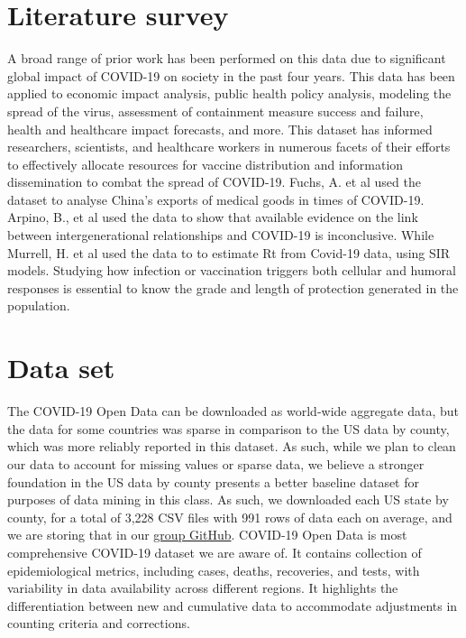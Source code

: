 \documentclass[sigconf,screen,nonacm]{acmart}
\begin{document}
\section{Literature survey}
A broad range of prior work has been performed on this data due to significant global impact of COVID-19 on society in the past four years. This data has been applied to economic impact analysis, public health policy analysis, modeling the spread of the virus, assessment of containment measure success and failure, health and healthcare impact forecasts, and more. This dataset has informed researchers, scientists, and healthcare workers in numerous facets of their efforts to effectively allocate resources for vaccine distribution and information dissemination to combat the spread of COVID-19. Fuchs, A. et al \cite{fuchs2020mask} used the dataset to analyse China’s exports of medical goods in times of COVID-19. Arpino, B., et al \cite{arpino2020no} used the data to show that available evidence on the link between intergenerational relationships and COVID-19 is inconclusive. While Murrell, H. et al \cite{murrell2020estimating} used the data to to estimate Rt from Covid-19 data, using SIR models. Studying how infection or vaccination triggers both cellular and humoral responses is essential to know the grade and length of protection generated in the population.

\section{Data set}

The COVID-19 Open Data can be downloaded as world-wide aggregate data, but the data for some countries was sparse in comparison to the US data by county, which was more reliably reported in this dataset. As such, while we plan to clean our data to account for missing values or sparse data, we believe a stronger foundation in the US data by county presents a better baseline dataset for purposes of data mining in this class. As such, we downloaded each US state by county, for a total of 3,228 CSV files with 991 rows of data each on average, and we are storing that in our \href{https://github.com/CCoakley6/DataMiningProjectSpring2024}{group GitHub}. COVID-19 Open Data is most comprehensive COVID-19 dataset we are aware of. It contains collection of epidemiological metrics, including cases, deaths, recoveries, and tests, with variability in data availability across different regions. It highlights the differentiation between new and cumulative data to accommodate adjustments in counting criteria and corrections.
\end{document}
